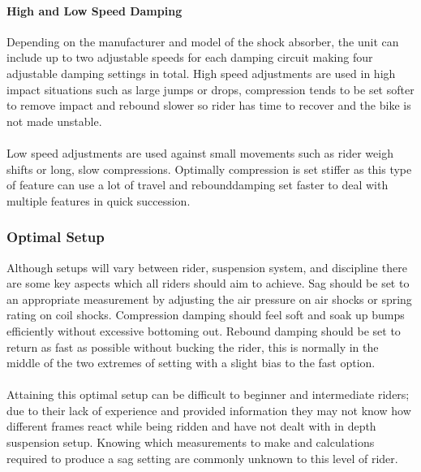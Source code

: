 	\paragraph{High and Low Speed Damping} 
		Depending on the manufacturer and model of the shock absorber, the unit can include up to two adjustable speeds for each damping circuit making four adjustable damping settings in total. High speed adjustments are used in high impact situations such as large jumps or drops, compression tends to be set softer to remove impact and rebound slower so rider has time to recover and the bike is not made unstable.
		\\\\
		Low speed adjustments are used against small movements such as rider weigh shifts or long, slow compressions. Optimally compression is set stiffer as this type of feature can use a lot of travel and \gls{rebounddamping} set faster to deal with multiple features in quick succession.
	\subsubsection{Optimal Setup}
		Although setups will vary between rider, suspension system, and discipline there are some 
		key aspects which all riders should aim to achieve. Sag should be set to an appropriate 
		measurement by adjusting the air pressure on air \glspl{shock} or spring rating on coil 
		\glspl{shock}. Compression damping should feel soft and soak up bumps efficiently without 
		excessive bottoming out. Rebound damping should be set to return as fast as possible 
		without bucking the rider, this is normally in the middle of the two extremes of setting 
		with a slight bias to the fast option.
		\\\\
		Attaining this optimal setup can be difficult to beginner and intermediate riders; due to 
		their lack of experience and provided information they may not know how different frames 
		react while being ridden and have not dealt with in depth suspension setup. Knowing which measurements to make and calculations required to produce a sag setting are commonly unknown to this level of rider.